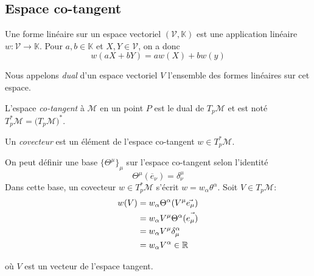 \subsection{Espace co-tangent}
\begin{theoremframe}
    \begin{defi}
        Une forme linéaire sur un espace vectoriel $(\mathcal{V},\mathbb{K})$ est une application linéaire $w:\mathcal{V} \to \mathbb{K}$. Pour $a,b\in \mathbb{K}$ et $X,Y \in \mathcal{V}$, on a donc
        \begin{equation}
            w(aX+bY) = aw(X)+bw(y)
        \end{equation}
    \end{defi}
\end{theoremframe}
Nous appelons \textit{dual} d'un espace vectoriel $V$ l'ensemble des formes linéaires sur cet espace.
\begin{theoremframe}
    \begin{defi}
        L'espace \textit{co-tangent} à $\mathcal{M}$ en un point $P$ est le dual de $T_p\mathcal{M}$ et est noté $T_p^*\mathcal{M} = (T_p\mathcal{M)^*}$.
    \end{defi}
\end{theoremframe}
\begin{theoremframe}
    \begin{defi}
        Un \textit{covecteur} est un élément de l'espace co-tangent $w\in T_p^*\mathcal{M}$.
    \end{defi}
\end{theoremframe}
On peut définir une base $\{\Theta^\mu\}_\mu$ sur l'espace co-tangent selon l'identité
\begin{equation}
    \Theta^\mu(\overline{e}_\nu)=\delta^\mu_\nu
\end{equation}
Dans cette base, un covecteur $w\in T_p^*\mathcal{M}$ s'écrit $w = w_\alpha \theta^\alpha$. Soit $V \in T_p\mathcal{M}$:
\begin{align}
    w(V) &= w_{\alpha} \Theta^{\alpha}(V^{\mu} \Vec{e_{\mu}})\\
    &=w_{\alpha} V^{\mu}\Theta^{\alpha} (\Vec{e_{\mu})}\\
    &= w_{\alpha} V^{\mu}\delta^{\alpha}_{\mu}\\
    &= w_{\alpha} V^{\alpha} \in \mathbb{R}
\end{align}


où $V$ est un vecteur de l'espace tangent. 

